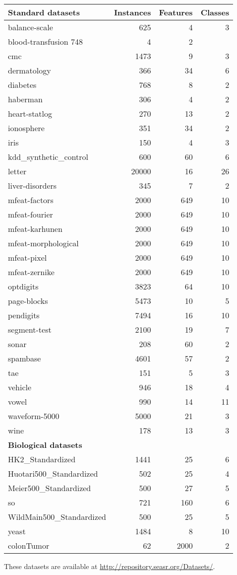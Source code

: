 \begin{tabularx}{\textwidth}{X r r r}
\bf Standard datasets& \bf Instances & \bf Features & \bf Classes\\
\hline

balance-scale & 625 & 4 & 3\\
blood-transfusion  748 & 4 & 2\\
cmc & 1473 & 9 & 3\\
dermatology & 366 & 34 & 6 \\
diabetes & 768 & 8 & 2\\
haberman & 306 & 4 & 2\\
heart-statlog & 270 & 13 & 2 \\
ionosphere & 351 & 34 & 2\\
iris & 150 & 4 & 3\\
kdd\_synthetic\_control & 600 & 60 & 6\\
letter & 20000 & 16 & 26\\
liver-disorders & 345 & 7 & 2 \\
mfeat-factors & 2000 & 649 & 10 \\
mfeat-fourier & 2000 & 649 & 10 \\
mfeat-karhunen & 2000 & 649 & 10 \\
mfeat-morphological  & 2000 & 649 & 10 \\
mfeat-pixel & 2000 & 649 & 10 \\
mfeat-zernike  & 2000 & 649 & 10 \\
optdigits & 3823 & 64 & 10 \\
page-blocks & 5473 & 10 & 5 \\
pendigits & 7494 & 16 & 10 \\
segment-test & 2100 & 19 & 7\\
sonar & 208 & 60 & 2\\
spambase & 4601 & 57 & 2\\
tae & 151 & 5 & 3 \\
vehicle & 946 & 18 & 4\\
vowel & 990 & 14 & 11 \\
waveform-5000 & 5000 & 21 & 3\\
wine & 178 & 13 & 3 \\
\bf Biological datasets & & & \\
\hline
HK2\_Standardized & 1441 & 25 & 6 \\
Huotari500\_Standardized & 502 & 25 & 4 \\
Meier500\_Standardized & 500 & 27 & 5 \\
so & 721 & 160 & 6\\
WildMain500\_Standardized & 500 & 25 & 5 \\
yeast & 1484 & 8 & 10 \\
colonTumor & 62 & 2000 & 2\\
\end{tabularx}

These datasets are available at \url{http://repository.seasr.org/Datasets/}.
